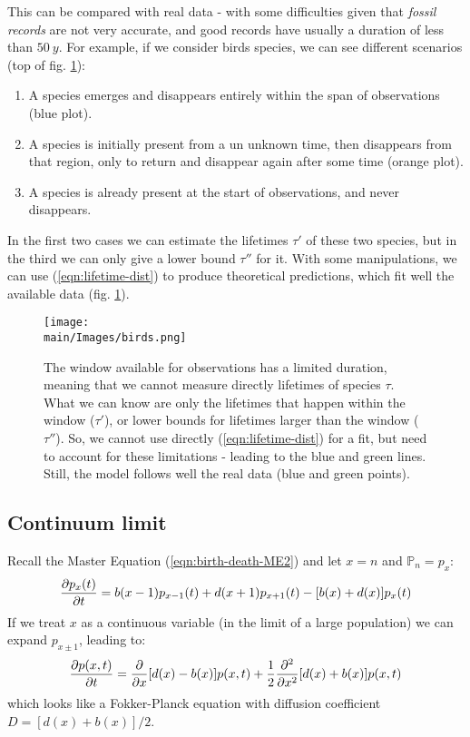 \documentclass[../../main.tex]{subfiles}
\begin{document}
This can be compared with real data - with some difficulties given that \textit{fossil records} are not very accurate, and good records have usually a duration of less than $\SI{50}{y}$. For example, if we consider birds species, we can see different scenarios (top of fig. \ref{fig:birds}):
\begin{enumerate}
    \item A species emerges and disappears entirely within the span of observations (blue plot).
    \item A species is initially present from a un unknown time, then disappears from that region, only to return and disappear again after some time (orange plot).
    \item A species is already present at the start of observations, and never disappears.
\end{enumerate}
In the first two cases we can estimate the lifetimes $\tau'$ of these two species, but in the third we can only give a lower bound $\tau''$ for it. With some manipulations, we can use (\ref{eqn:lifetime-dist}) to produce theoretical predictions, which fit well the available data (fig. \ref{fig:birds}).

\begin{figure}[H]
    \centering
    \texttt{[image: \\main/Images/birds.png]}
    \caption{The window available for observations has a limited duration, meaning that we cannot measure directly lifetimes of species $\tau$. What we can know are only the lifetimes that happen within the window ($\tau'$), or lower bounds for lifetimes larger than the window ($\tau''$). So, we cannot use directly (\ref{eqn:lifetime-dist}) for a fit, but need to account for these limitations - leading to the blue and green lines. Still, the model follows well the real data (blue and green points).}
    \label{fig:birds}
\end{figure}


\subsection{Continuum limit}\label{sec:birth-death-continuum}
Recall the Master Equation (\ref{eqn:birth-death-ME2}) and let $x = n$ and $\mathbb{P}_n = p_x$:
\begin{align*}
    \pdv{p_x(t)}{t}=b(x-1) p_{x-1}(t)+d(x+1) p_{x+1}(t)-[b(x)+d(x)] p_{x}(t)
\end{align*}
If we treat $x$ as a continuous variable (in the limit of a large population) we can expand $p_{x\pm1}$, leading to:
\begin{align}\label{eqn:me-fokker-planck}
    \pdv{p(x,t)}{t} = \pdv{x} [d(x) - b(x)] p(x,t) + \frac{1}{2} \pdv[2]{x} [d(x) + b(x)] p(x,t) 
\end{align}
which looks like a Fokker-Planck equation with diffusion coefficient $D = [d(x) + b(x)]/2$.
\end{document}
